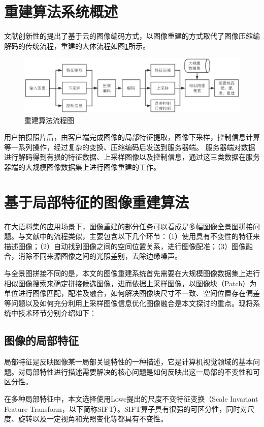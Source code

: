 \documentclass[UTF8]{csoarticle}
\begin{document}
\section{重建算法系统概述}
文献\cite{Cloud}创新性的提出了基于云的图像编码方式，以图像重建的方式取代了图像压缩编解码的传统流程，重建的大体流程如图\ref{fig:flow}所示。
\begin{figure}
\centering\includegraphics[width=15cm]{flowchart}
\caption{重建算法流程图}
\label{fig:flow}
\end{figure}
用户拍摄照片后，由客户端完成图像的局部特征提取，图像下采样，控制信息计算等一系列操作，经过复杂的变换、压缩编码后发送到服务器端。
服务器端对数据进行解码得到有损的特征数据、上采样图像以及控制信息，通过这三类数据在服务器端的大规模图像数据集上进行图像重建的工作。

\section{基于局部特征的图像重建算法}
在大语料集的应用场景下，图像重建的部分任务可以看成是多幅图像全景图拼接问题。与文献\cite{Brown:2006ir}中的流程类似，主要包含以下几个环节：（1）使用具有不变性的特征来描述图像；（2）自动找到图像之间的空间位置关系，进行图像配准；（3）图像融合，消除不同来源图像之间的光照差别，去除边缘噪声。

与全景图拼接不同的是，本文的图像重建系统首先需要在大规模图像数据集上进行相似图像搜索来确定拼接候选图像，进而依据上采样图像，以图像块（Patch）为单位进行图像匹配，配准及融合，如何解决图像块尺寸不一致、空间位置存在偏差等问题以及如何充分利用上采样图像信息优化图像融合是本文探讨的重点。现将系统中技术环节分别介绍如下：

\subsection{图像的局部特征}
局部特征是反映图像某一局部关键特性的一种描述，它是计算机视觉领域的基本问题。对局部特性进行描述需要解决的核心问题是如何反映出这一局部的不变性和可区分性。

在多种局部特征中，本文选择使用Lowe提出的尺度不变特征变换（Scale Invariant Feature Transform，以下简称SIFT）。SIFT算子具有很强的可区分性，同时对尺度、旋转以及一定视角和光照变化等都具有不变性。
\end{document}
